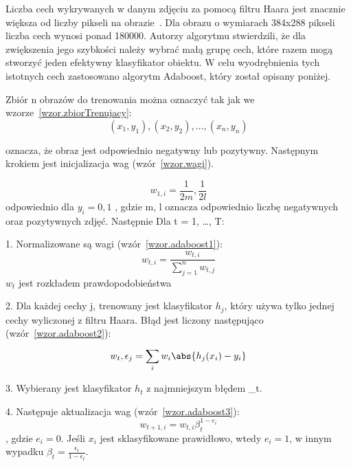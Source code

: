 \documentclass[a4paper,twoside,12pt]{book}
\begin{document}
    Liczba cech wykrywanych w danym zdjęciu za
    pomocą filtru Haara jest znacznie większa od liczby pikseli na obrazie~\cite{violaJones}.
    Dla obrazu o wymiarach 384x288 pikseli liczba cech wynosi ponad 180000.
    Autorzy algorytmu stwierdzili, że dla zwiększenia jego szybkości należy wybrać małą grupę cech,
    które razem mogą stworzyć jeden efektywny klasyfikator obiektu.
    W celu wyodrębnienia tych istotnych cech zastosowano algorytm Adaboost, który został opisany poniżej.

    Zbiór n obrazów do trenowania można oznaczyć tak jak we wzorze~\ref{wzor.zbiorTrenujacy}:
    \large
    \begin{equation}
        (x_1, y_1), (x_2, y_2), \ldots, (x_n, y_n)
        \label{wzor.zbiorTrenujacy}
    \end{equation}
    \normalsize

    oznacza, że obraz jest odpowiednio negatywny lub pozytywny.
    Następnym krokiem jest inicjalizacja wag (wzór~\ref{wzor.wagi}).

    \large
    \begin{equation}
        w_{1,i} = \frac{1}{2m}, \frac{1}{2l}
        \label{wzor.wagi}
    \end{equation}
    \normalsize
    odpowiednio dla $y_i = 0, 1$
    , gdzie m, l oznacza odpowiednio liczbę negatywnych oraz pozytywnych zdjęć.
    Następnie
    Dla t = 1, \ldots, T:

    1. Normalizowane są wagi (wzór~\ref{wzor.adaboost1}):
    \large
    \begin{equation}
        w_{t,i} = \frac{w_{t,i}}{\sum_{j=1}^{n}w_{t,j}}
        \label{wzor.adaboost1}
    \end{equation}
    \normalsize
    $w_{t}$ jest rozkładem prawdopodobieństwa

    2. Dla każdej cechy j, trenowany jest klasyfikator $h_{j}$, który używa tylko jednej cechy wyliczonej z filtru Haara.
    Błąd jest liczony następująco (wzór~\ref{wzor.adaboost2}):
    \large
    \begin{equation}
        w_{t}, \epsilon_{j} = \sum_{i}^{}w_{i} \abs{h_{j}(x_{i}) - y_{i}}
        \label{wzor.adaboost2}
    \end{equation}
    \normalsize

    3. Wybierany jest klasyfikator $h_{t}$ z najmniejszym błędem \epsilon_{t}.

    4. Następuje aktualizacja wag (wzór~\ref{wzor.adaboost3}):
    \large
    \begin{equation}
        w_{t+1,i} = w_{t,i}\beta_{t}^{1-e_{i}}
        \label{wzor.adaboost3}
    \end{equation}
    \normalsize
    , gdzie $e_{i} = 0$. Jeśli $x_{i}$ jest sklasyfikowane prawidłowo, wtedy $e_{i}=1$,
    w innym wypadku $\beta_{t} = \frac{\epsilon_{t}}{1 - \epsilon_{t}}$.
\end{document}
